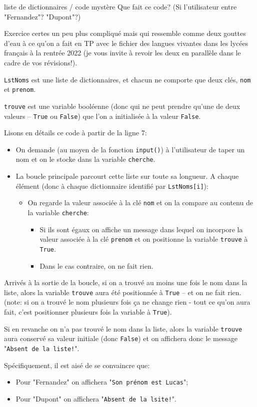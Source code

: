 \documentclass[12pt]{article}
\begin{document}
	\begin{MonQz}{liste de dictionnaires / code mystère}
		Que fait ce code? (Si l'utilisateur entre "Fernandez"? "Dupont"?)
	\end{MonQz}
	\begin{MaReponse}
		Exercice certes un peu plus compliqué mais qui ressemble comme deux gouttes d'eau à ce qu'on a fait en TP avec le fichier des langues vivantes dans les lycées français à la rentrée 2022 (je vous invite à revoir les deux en parallèle dans le cadre de vos révisions!).
		
		\texttt{LstNoms} est une liste de dictionnaires, et chacun ne comporte que deux clés, \texttt{nom} et \texttt{prenom}.
		
		\texttt{trouve} est une variable booléenne (donc qui ne peut prendre qu'une de deux valeurs -- \texttt{True} ou \texttt{False}) que l'on a initialisée à la valeur \texttt{False}.
		
		Lisons en détails ce code à partir de la ligne 7:
		\begin{itemize}
			\item On demande (au moyen de la fonction \texttt{input()}) à l'utilisateur de taper un nom et on le stocke dans la variable \texttt{cherche}.
			\item La boucle principale parcourt cette liste sur toute sa longueur. A chaque élément
			  (donc à chaque dictionnaire identifié par \texttt{LstNoms[i]}):
			  \begin{itemize}
			  	\item On regarde la valeur associée à la clé \texttt{nom} et on la compare au contenu de la variable \texttt{cherche}:
			  	\begin{itemize}
			  		\item Si ils sont égaux on affiche un message dans lequel on incorpore la valeur associée à la clé \texttt{prenom} et on positionne la variable \texttt{trouve} à \texttt{True}.
			  		\item Dans le cas contraire, on ne fait rien.
			  	\end{itemize}
			  \end{itemize}
		\end{itemize}
		Arrivés à la sortie de la boucle, si on a trouvé au moins une fois le nom dans la liste, alors la variable \texttt{trouve} aura été positionnée à \texttt{True} -- et on ne fait rien. (note: si on a trouvé le nom plusieurs fois ça ne change rien - tout ce qu'on aura fait, c'est positionner plusieurs fois la variable à \texttt{True}).
		
		Si en revanche on n'a pas trouvé le nom dans la liste, alors la variable \texttt{trouve} aura  conservé sa valeur initiale (donc \texttt{False}) et on affichera donc le message "\texttt{Absent de la liste!}".
		
		Spécifiquement, il est aisé de se convaincre que:
		\begin{itemize}
			\item Pour "Fernandez" on affichera "\texttt{Son prénom est Lucas}";
			\item Pour "Dupont" on affichera "\texttt{Absent de la lsite!}".
		\end{itemize}
	\end{MaReponse}
\end{document}
